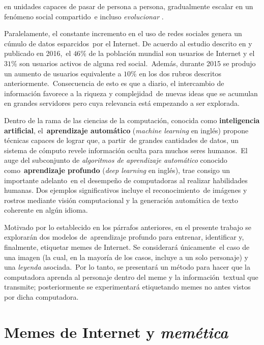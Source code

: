 en unidades capaces de pasar de persona a persona, gradualmente escalar en un fenómeno social compartido\
e incluso \emph{evolucionar} \cite{shifman2014}.\par
Paralelamente, el constante incremento en el uso de redes sociales genera un cúmulo de datos esparcidos\
por el Internet. De acuerdo al estudio descrito en \cite{website:smartinsights} y publicado en 2016,\
el $46\%$ de la población mundial son usuarios de Internet y el $31\%$ son usuarios activos de alguna red social.\
Además, durante 2015 se produjo un aumento de usuarios equivalente a $10\%$ en los dos rubros descritos anteriormente.\
Consecuencia de esto es que a diario, el intercambio de información favorece a la riqueza y complejidad\
de nuevas ideas que se acumulan en grandes servidores pero cuya relevancia está empezando a ser explorada.\par
Dentro de la rama de las ciencias de la computación, conocida como \textbf{inteligencia artificial}, el\
\textbf{aprendizaje automático} (\emph{machine learning} en inglés) propone técnicas capaces de lograr que, a partir\
de grandes cantidades de datos, un sistema de cómputo revele información oculta para muchos seres humanos.\
El auge del subconjunto de \emph{algoritmos de aprendizaje automático} conocido como\
\textbf{aprendizaje profundo} (\emph{deep learning} en inglés), trae consigo un importante adelanto\
en el desempeño de computadoras al realizar habilidades humanas. Dos ejemplos significativos incluye el reconocimiento\
de imágenes y rostros mediante visión computacional y la generación automática de texto coherente en algún idioma.\par
Motivado por lo establecido en los párrafos anteriores, en el presente trabajo se explorarán dos modelos de\
aprendizaje profundo para entrenar, identificar y, finalmente, etiquetar memes de Internet. Se considerará únicamente\
el caso de una imagen (la cual, en la mayoría de los casos, incluye a un solo personaje) y una \emph{leyenda} asociada.\
Por lo tanto, se presentará un método para hacer que la computadora aprenda al personaje dentro del meme y la información\
textual que transmite; posteriormente se experimentará etiquetando memes no antes vistos por dicha computadora.

\section{Memes de Internet y \emph{memética}}

